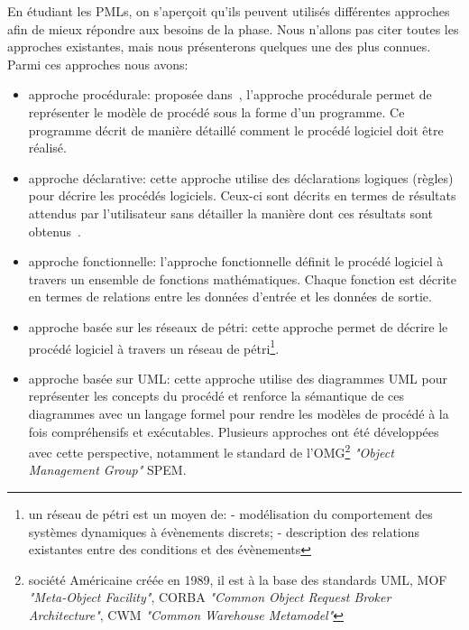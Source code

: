 En étudiant les PMLs, on s'aperçoit qu'ils peuvent utilisés différentes approches afin de mieux répondre aux besoins de la phase. Nous n'allons pas citer toutes les approches existantes, mais nous présenterons quelques une des plus connues. Parmi ces approches nous avons:
\begin{itemize}
\item approche procédurale: proposée dans~\cite{lo}, l'approche procédurale permet de représenter le modèle de procédé sous la forme d'un programme. Ce programme décrit de manière détaillé comment le procédé logiciel doit être réalisé.
\item approche déclarative: cette approche utilise des déclarations logiques (règles) pour décrire les procédés logiciels. Ceux-ci sont décrits en termes de résultats attendus par l'utilisateur sans détailler la manière dont ces résultats sont obtenus~\cite{lgw}.
\item approche fonctionnelle: l'approche fonctionnelle définit le procédé logiciel à travers un ensemble de fonctions mathématiques. Chaque fonction est décrite en termes de relations entre les données d'entrée et les données de sortie. 
\item approche basée sur les réseaux de pétri: cette approche permet de décrire le procédé logiciel à travers un réseau de pétri\footnote{un réseau de pétri est un moyen de: - modélisation du comportement des systèmes dynamiques à évènements discrets; - description des relations existantes entre des conditions et des évènements}.
\item approche basée sur UML: cette approche utilise des diagrammes UML pour représenter les concepts du procédé et renforce la sémantique de ces diagrammes avec un langage formel pour rendre les modèles de procédé à la fois compréhensifs et exécutables. 
Plusieurs approches ont été développées avec cette perspective, notamment le standard de l'OMG\footnote{société Américaine créée en 1989, il est à la base des standards UML, MOF \textit{"Meta-Object Facility"}, CORBA \textit{"Common Object Request Broker Architecture"}, CWM \textit{"Common Warehouse Metamodel"}} \textit{"Object Management Group"} SPEM.

\end{itemize}
